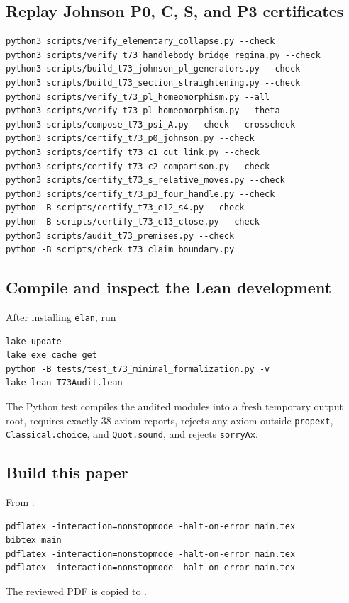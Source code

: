 \subsection{Replay Johnson P0, C, S, and P3 certificates}

\begin{verbatim}
python3 scripts/verify_elementary_collapse.py --check
python3 scripts/verify_t73_handlebody_bridge_regina.py --check
python3 scripts/build_t73_johnson_pl_generators.py --check
python3 scripts/build_t73_section_straightening.py --check
python3 scripts/verify_t73_pl_homeomorphism.py --all
python3 scripts/verify_t73_pl_homeomorphism.py --theta
python3 scripts/compose_t73_psi_A.py --check --crosscheck
python3 scripts/certify_t73_p0_johnson.py --check
python3 scripts/certify_t73_c1_cut_link.py --check
python3 scripts/certify_t73_c2_comparison.py --check
python3 scripts/certify_t73_s_relative_moves.py --check
python3 scripts/certify_t73_p3_four_handle.py --check
python -B scripts/certify_t73_e12_s4.py --check
python -B scripts/certify_t73_e13_close.py --check
python3 scripts/audit_t73_premises.py --check
python -B scripts/check_t73_claim_boundary.py
\end{verbatim}

\subsection{Compile and inspect the Lean development}

After installing \texttt{elan}, run
\begin{verbatim}
lake update
lake exe cache get
python -B tests/test_t73_minimal_formalization.py -v
lake lean T73Audit.lean
\end{verbatim}
The Python test compiles the audited modules into a fresh temporary output
root, requires exactly $38$ axiom reports, rejects any axiom outside
\texttt{propext}, \texttt{Classical.choice}, and \texttt{Quot.sound}, and
rejects \texttt{sorryAx}.

\subsection{Build this paper}

From :
\begin{verbatim}
pdflatex -interaction=nonstopmode -halt-on-error main.tex
bibtex main
pdflatex -interaction=nonstopmode -halt-on-error main.tex
pdflatex -interaction=nonstopmode -halt-on-error main.tex
\end{verbatim}
The reviewed PDF is copied to
.

